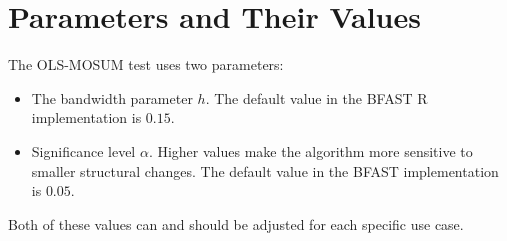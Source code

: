 \documentclass[main.tex]{subfiles}
\begin{document}
\section{Parameters and Their Values}
\label{sec:mosum_parameters}
The OLS-MOSUM test uses two parameters:
\begin{itemize}
\item The bandwidth parameter $h$. The default value in the BFAST R implementation
  \cite{bfast-github} is $0.15$.
\item Significance level $\alpha$. Higher values make the algorithm more
  sensitive to smaller structural changes. The default value in the BFAST implementation is $0.05$. 
\end{itemize}
Both of these values can and should be adjusted for each specific use case.

\biblio
\end{document}
